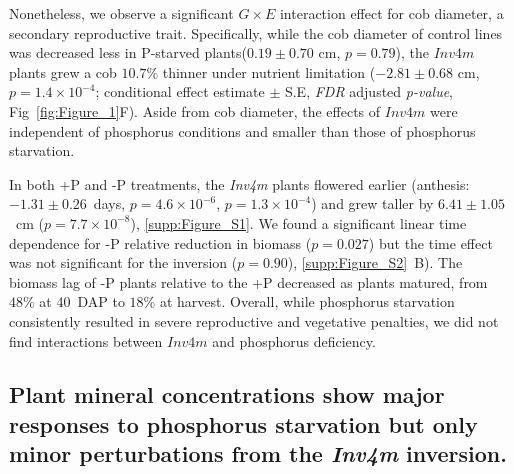 \documentclass[9pt,twocolumn,twoside]{rilabRxiv}
\newcommand{\invfour}{\textit{Inv4m}\xspace}
\begin{document}
Nonetheless, we observe a significant $G \times E$ interaction effect for cob diameter, a secondary reproductive trait.
Specifically, while the cob diameter of control lines was decreased less in P-starved plants($0.19 \pm 0.70$ cm, $p= 0.79$), the $\invfour$ plants grew a cob  $10.7\%$ thinner under nutrient limitation ($-2.81 \pm 0.68$ cm, $p= 1.4 \times 10^{-4}$; conditional effect estimate $\pm$ S.E, \textit{FDR} adjusted \textit{p-value}, Fig~\ref{fig:Figure_1}F).
Aside from cob diameter, the effects of $\invfour$ were independent of phosphorus conditions and smaller than those of phosphorus starvation.

In both +P and -P treatments, the \invfour plants flowered earlier (anthesis: $-1.31 \pm 0.26$~days, $p = 4.6 \times 10^{-6}$, $p = 1.3 \times 10^{-4}$) and grew taller by $6.41 \pm 1.05$~cm ($p = 7.7 \times 10^{-8}$), \ref{supp:Figure_S1}.
We found a significant linear time dependence for -P relative reduction in biomass ($p = 0.027$) but the time effect was not significant for the inversion ($p = 0.90$), \ref{supp:Figure_S2}~B).
The biomass lag of -P plants relative to the +P decreased as plants matured, from $48\%$ at 40~DAP to $18\%$ at harvest.
Overall, while phosphorus starvation consistently resulted in severe reproductive and vegetative penalties, we did not find interactions between $\invfour$ and phosphorus deficiency.

\subsection*{Plant mineral concentrations show major responses to phosphorus starvation but only minor perturbations from the \invfour inversion.}
\end{document}
